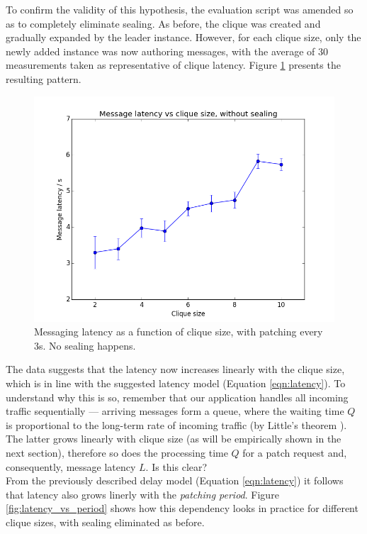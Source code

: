 \documentclass[a4paper, 12pt]{report}
\begin{document}
To confirm the validity of this hypothesis, the evaluation script was amended so as to completely eliminate sealing. As before, the clique was created and gradually expanded by the leader instance. However, for each clique size, only the newly added instance was now authoring messages, with the average of 30 measurements taken as representative of clique latency. Figure \ref{fig:latency_vs_N} presents the resulting pattern. \\

\begin{figure}[h]
    \captionsetup{width=0.7\textwidth}
    \centering
    \includegraphics[width=0.7\linewidth]{pics/eval/latency_vs_N.png}
    \caption{\label{fig:latency_vs_N} Messaging latency as a function of clique size, with patching every 3s. No sealing happens.}
\end{figure}

The data suggests that the latency now increases linearly with the clique size, which is in line with the suggested latency model (Equation \ref{eqn:latency}). To understand why this is so, remember that our application handles all incoming traffic sequentially --- arriving messages form a queue, where the waiting time $Q$ is proportional to the long-term rate of incoming traffic (by Little's theorem \cite{little1961proof}). The latter grows linearly with clique size (as will be empirically shown in the next section), therefore so does the processing time $Q$ for a patch request and, consequently, message latency $L$. {\color{red} Is this clear?}\\

From the previously described delay model (Equation \ref{eqn:latency}) it follows that latency also grows linerly with the \emph{patching period}. Figure \ref{fig:latency_vs_period} shows how this dependency looks in practice for different clique sizes, with sealing eliminated as before.
\end{document}

